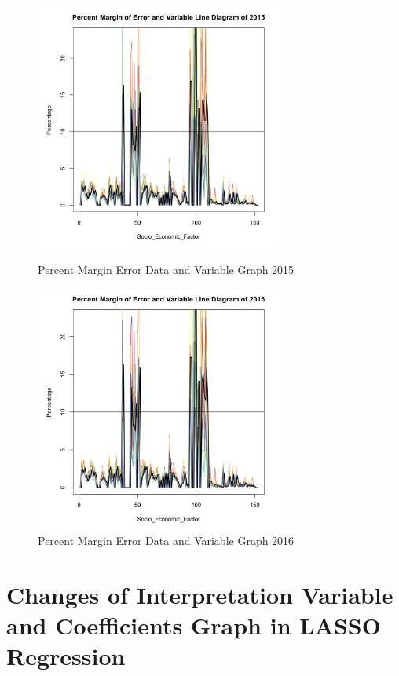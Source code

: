 \documentclass{mcmthesis}
\begin{document}
\begin{appendices}
\begin{figure}[H]
\centering
\begin{minipage}[t]{0.45\textwidth}
\centering
\includegraphics[width=3.2in]{figures/PercentMarginErrorDataGraphVariable2015.jpeg}
\caption{Percent Margin Error Data and Variable Graph 2015}
\label{Percent Margin Error Data and Variable Graph 2015}
\end{minipage}
\hfill
\begin{minipage}[t]{0.45\textwidth}
\centering
\includegraphics[width=3.2in]{figures/PercentMarginErrorDataGraphVariable2016.jpeg}
\caption{Percent Margin Error Data and Variable Graph 2016}
\label{Percent Margin Error Data and Variable Graph 2016}
\end{minipage}
\end{figure}


\section{Changes of Interpretation Variable and Coefficients Graph in LASSO Regression}\label{Changes of Interpretation Variable and Coefficients Graph in LASSO Regression}


\end{appendices}
\end{document}
